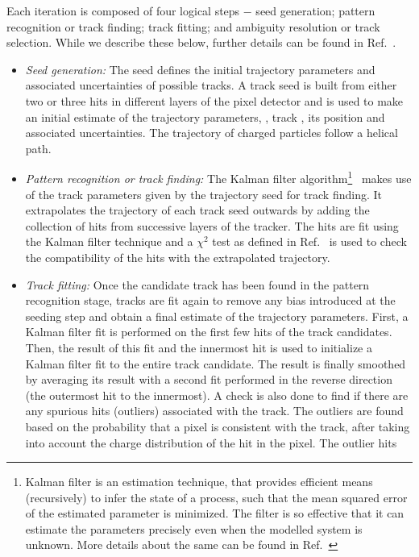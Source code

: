 Each iteration is composed of four logical steps $-$ seed generation; pattern recognition or track finding; track fitting; and ambiguity
resolution or track selection. While we describe these below, further details can be found in Ref.~\cite{Chatrchyan:2014fea}. 
\begin{itemize}
\item \emph{Seed generation:} The seed defines the initial trajectory parameters and associated uncertainties of possible tracks. A track seed is 
built from either two or three hits in different layers of the pixel detector and is used to make an initial estimate of the trajectory parameters, 
\ie, track \pt, its position and associated uncertainties. The trajectory of charged particles follow a helical path.
\item \emph{Pattern recognition or track finding:} The Kalman filter algorithm\footnote{ Kalman filter is an estimation technique, that provides 
efficient means (recursively) to infer the state of a process, such that the mean squared error of the estimated parameter is minimized. The filter 
is so effective that it can estimate the parameters precisely even when the modelled system is unknown. More details about the same can be found 
in Ref.~\cite{Fruhwirth:1987fm}}~\cite{Fruhwirth:1987fm} makes use of the track parameters given by the trajectory seed for track finding. It 
extrapolates the trajectory of each track seed outwards by adding the collection of hits from successive layers of the tracker. The hits are fit
using the Kalman filter technique and a $\chi^{2}$ test as defined in Ref.~\cite{Chatrchyan:2014fea} is used to check the compatibility of 
the hits with the extrapolated trajectory.
\item \emph{Track fitting:} Once the candidate track has been found in the pattern recognition stage, tracks are fit again to remove any bias
introduced at the seeding step and obtain a final estimate of the trajectory parameters. First, a Kalman filter fit is performed on the first few 
hits of the track candidates. Then, the result of this fit and the innermost hit is used to initialize a Kalman filter fit to the entire track
candidate. The result is finally smoothed by averaging its result with a second fit performed in the reverse direction (the outermost hit to the 
innermost). A check is also done to find if there are any spurious hits (outliers) associated with the track. The outliers are found based on the 
probability that a pixel is consistent with the track, after taking into account the charge distribution of the hit in the pixel. The outlier hits 

\end{itemize}
